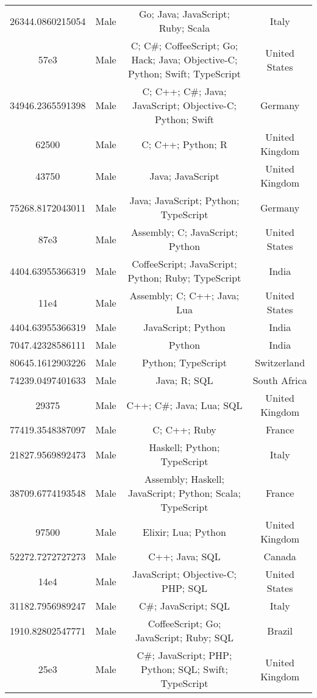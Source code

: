\begin{center}
\begin{tabular}{ |c|c|c|c| }
26344.0860215054  &  Male  &  Go; Java; JavaScript; Ruby; Scala  &  Italy  \\ 
57e3  &  Male  &  C; C\#; CoffeeScript; Go; Hack; Java; Objective-C; Python; Swift; TypeScript  &  United States  \\ 
34946.2365591398  &  Male  &  C; C++; C\#; Java; JavaScript; Objective-C; Python; Swift  &  Germany  \\ 
62500  &  Male  &  C; C++; Python; R  &  United Kingdom  \\ 
43750  &  Male  &  Java; JavaScript  &  United Kingdom  \\ 
75268.8172043011  &  Male  &  Java; JavaScript; Python; TypeScript  &  Germany  \\ 
87e3  &  Male  &  Assembly; C; JavaScript; Python  &  United States  \\ 
4404.63955366319  &  Male  &  CoffeeScript; JavaScript; Python; Ruby; TypeScript  &  India  \\ 
11e4  &  Male  &  Assembly; C; C++; Java; Lua  &  United States  \\ 
4404.63955366319  &  Male  &  JavaScript; Python  &  India  \\ 
7047.42328586111  &  Male  &  Python  &  India  \\ 
80645.1612903226  &  Male  &  Python; TypeScript  &  Switzerland  \\ 
74239.0497401633  &  Male  &  Java; R; SQL  &  South Africa  \\ 
29375  &  Male  &  C++; C\#; Java; Lua; SQL  &  United Kingdom  \\ 
77419.3548387097  &  Male  &  C; C++; Ruby  &  France  \\ 
21827.9569892473  &  Male  &  Haskell; Python; TypeScript  &  Italy  \\ 
38709.6774193548  &  Male  &  Assembly; Haskell; JavaScript; Python; Scala; TypeScript  &  France  \\ 
97500  &  Male  &  Elixir; Lua; Python  &  United Kingdom  \\ 
52272.7272727273  &  Male  &  C++; Java; SQL  &  Canada  \\ 
14e4  &  Male  &  JavaScript; Objective-C; PHP; SQL  &  United States  \\ 
31182.7956989247  &  Male  &  C\#; JavaScript; SQL  &  Italy  \\ 
1910.82802547771  &  Male  &  CoffeeScript; Go; JavaScript; Ruby; SQL  &  Brazil  \\ 
25e3  &  Male  &  C\#; JavaScript; PHP; Python; SQL; Swift; TypeScript  &  United Kingdom  \\ 

\end{tabular}
\end{center}
